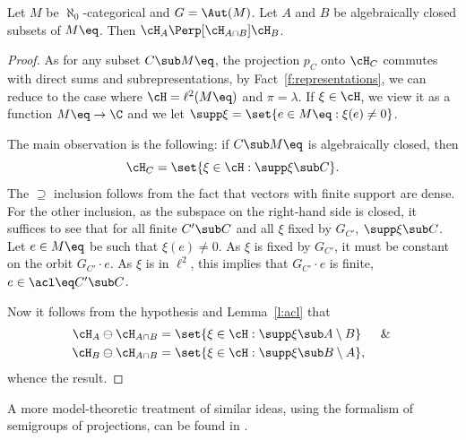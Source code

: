 \begin{prop}
\label{p:repr-independent}
Let $M$ be $\aleph_0$-categorical and $G = \Aut(M)$. Let $A$ and $B$ be algebraically closed subsets of $M\eq$. Then $\cH_{A} \Perp[\cH_{A \cap B}] \cH_{B}$.
\end{prop}
\begin{proof}
As for any subset $C \sub M\eq$, the projection $p_C$ onto $\cH_C$ commutes with
direct sums and subrepresentations, by Fact~\ref{f:representations}, we can reduce to the case where $\cH = \ell^2(M\eq)$ and $\pi = \lambda$. If $\xi \in \cH$, we view it as a function $M\eq \to \C$ and we let $\supp \xi = \set{e \in M\eq : \xi(e) \neq 0}$.

The main observation is the following: if $C \sub M\eq$ is algebraically closed, then
\begin{equation*}
\cH_C = \set{\xi \in \cH : \supp \xi \sub C }.
\end{equation*}
The $\supseteq$ inclusion follows from the fact that vectors with finite support are dense. For the other inclusion, as the subspace on the right-hand side is closed, it suffices to see that for all finite $C' \sub C$ and all $\xi$ fixed by $G_{C'}$, $\supp \xi \sub C$. Let $e \in M\eq$ be such that $\xi(e) \neq 0$. As $\xi$ is fixed by $G_{C'}$, it must be constant on the orbit $G_{C'} \cdot e$. As $\xi$ is in $\ell^2$, this implies that $G_{C'} \cdot e$ is finite, \ie $e \in \acl\eq C' \sub C$.

Now it follows from the hypothesis and Lemma~\ref{l:acl} that
\begin{align*}
\cH_A \ominus \cH_{A \cap B} &= \set{\xi \in \cH : \supp \xi \sub A \setminus B} \quad \And \\
\cH_B \ominus \cH_{A \cap B} &= \set{\xi \in \cH : \supp \xi \sub B \setminus A},
\end{align*}
whence the result.
\end{proof}
\begin{remark}
\label{rem:mt-approach}
A more model-theoretic treatment of similar ideas, using the formalism of semigroups of projections, can be found in \cite{BenYaacov2018}.
\end{remark}

